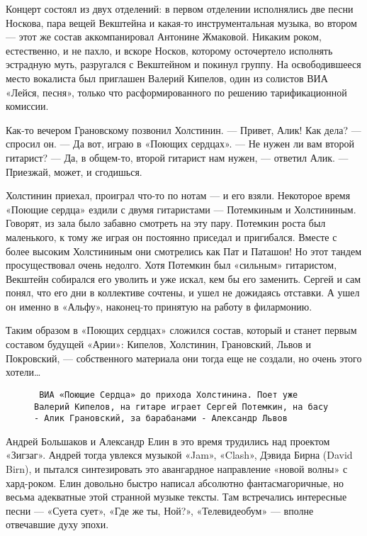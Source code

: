 Концерт состоял из двух отделений: в первом отделении исполнялись две песни Носкова, пара вещей Векштейна и какая-то
инструментальная музыка, во втором — этот же состав аккомпанировал Антонине Жмаковой. Никаким роком, естественно, и не
пахло, и вскоре Носков, которому осточертело исполнять эстрадную муть, разругался с Векштейном и покинул группу. На
освободившееся место вокалиста был приглашен Валерий Кипелов, один из солистов ВИА «Лейся, песня», только что
расформированного по решению тарификационной комиссии.

Как-то вечером Грановскому позвонил Холстинин.
— Привет, Алик! Как дела? — спросил он.
— Да вот, играю в «Поющих сердцах».
— Не нужен ли вам второй гитарист?
— Да, в общем-то, второй гитарист нам нужен, — ответил Алик. — Приезжай, может, и сгодишься.

Холстинин приехал, проиграл что-то по нотам — и его взяли. Некоторое время «Поющие сердца» ездили с двумя гитаристами —
Потемкиным и Холстининым. Говорят, из зала было забавно смотреть на эту пару. Потемкин роста был маленького, к тому же
играя он постоянно приседал и пригибался. Вместе с более высоким Холстининым они смотрелись как Пат и Паташон! Но этот
тандем просуществовал очень недолго. Хотя Потемкин был «сильным» гитаристом, Векштейн собирался его уволить и уже искал,
кем бы его заменить. Сергей и сам понял, что его дни в коллективе сочтены, и ушел не дожидаясь отставки. А ушел он
именно в «Альфу», наконец-то принятую на работу в филармонию.

Таким образом в «Поющих сердцах» сложился состав, который и станет первым составом будущей «Арии»: Кипелов, Холстинин,
Грановский, Львов и Покровский, — собственного материала они тогда еще не создали, но очень этого хотели\ldots

\begin{figure}[h]
    \centering
    \caption{\texttt{
        ВИА «Поющие Сердца» до прихода Холстинина. Поет уже Валерий Кипелов, на гитаре играет Сергей Потемкин, на басу -
        Алик Грановский, за барабанами - Александр Львов
    }}
\end{figure}

Андрей Большаков и Александр Елин в это время трудились над проектом «Зигзаг». Андрей тогда увлекся музыкой «Jam»,
«Clash», Дэвида Бирна (David Birn), и пытался синтезировать это авангардное направление «новой волны» с хард-роком. Елин
довольно быстро написал абсолютно фантасмагоричные, но весьма адекватные этой странной музыке тексты. Там встречались
интересные песни — «Суета сует», «Где же ты, Ной?», «Телевидеобум» — вполне отвечавшие духу эпохи.

